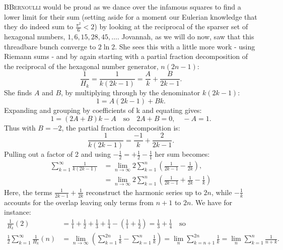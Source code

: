 \lettrine{B}{Bernoulli} would be proud as we dance over the infamous squares to find a lower limit for their sum (setting aside for a moment our Eulerian knowledge that they do indeed sum to \(\frac{\pi^2}{6}<2\)) by looking at the reciprocal of the sparser set of hexagonal numbers, \(1,6,15,28,45,…\). Jovannah, as we will do now, saw that this threadbare bunch converge to \(2\ln 2\). She sees this with a little more work - using Riemann sums - and by again starting with a partial fraction decomposition of the reciprocal of the hexagonal number generator, \(n(2n-1)\):
\[
\frac{1}{H_k}=\frac{1}{k(2k-1)} = \frac{A}{k} + \frac{B}{2k-1}.
\]
She finds \( A \) and \( B \), by multiplying through by the denominator \( k(2k-1) \):
\[
1 = A(2k-1) + Bk.
\]
Expanding and grouping by coefficients of k and equating gives:
\[
1 = (2A + B)k - A \quad\text{so}\quad 2A + B = 0, \quad -A = 1.
\]
Thus with \(B=-2\), the partial fraction decomposition  is:
\[
\frac{1}{k(2k-1)} = \frac{-1}{k} + \frac{2}{2k-1}.
\]
Pulling out a factor of 2 and using \(-\frac{1}{2}=+\frac{1}{2}-\frac{1}{1}\) her sum becomes:
\begin{align*}
\sum_{k=1}^\infty \frac{1}{k(2k-1)} 
&= \lim_{n \to \infty} 2 \sum_{k=1}^n \left( \frac{1}{2k-1} - \frac{1}{2k} \right),\\
&= \lim_{n \to \infty} 2 \sum_{k=1}^n \left( \frac{1}{2k-1} + \frac{1}{2k} - \frac{1}{k} \right)
\end{align*}
Here, the terms \( \frac{1}{2k-1} + \frac{1}{2k} \) reconstruct the harmonic series up to \( 2n \), while \( -\frac{1}{k} \) accounts for the overlap leaving only terms from \( n+1 \) to \( 2n \). We have for instance:
\begin{align*}
\frac{1}{H_k}(2)&=\frac{1}{1}+\frac{1}{2}+\frac{1}{3}+\frac{1}{4}-\left(\frac{1}{1}+\frac{1}{2}\right)=\frac{1}{3}+\frac{1}{4}\quad \text{so}\\
\frac{1}{2}\sum_{k=1}^\infty \frac{1}{H_k}(n) 
&=\lim_{n \to \infty} \left( \sum_{k=1}^{2n} \frac{1}{k} - \sum_{k=1}^n\frac{1}{k} \right)=\lim_n \sum_{k=n+1}^{2n}\frac{1}{k} =\lim_n \sum_{k=1}^n \frac{1}{n+k}.
\end{align*}

